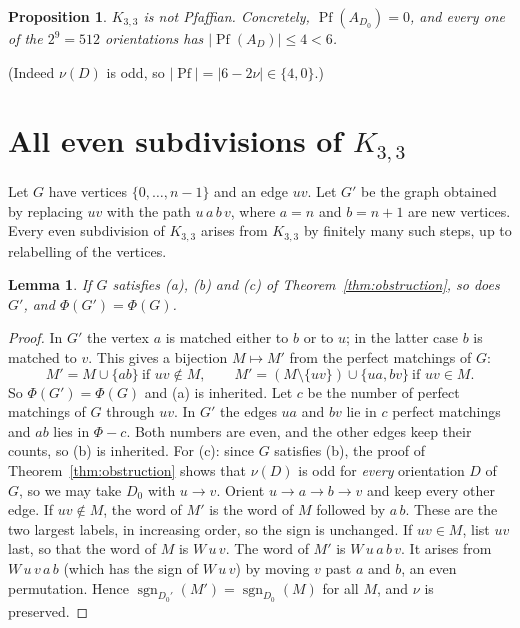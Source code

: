\documentclass[11pt]{article}
\newtheorem{lemma}[theorem]{Lemma}
\newtheorem{proposition}[theorem]{Proposition}
\theoremstyle{definition}
\theoremstyle{remark}
\begin{document}
\begin{proposition}\label{prop:k33}
$K_{3,3}$ is not Pfaffian. Concretely, $\operatorname{Pf}(A_{D_0})=0$, and every one of
the $2^9=512$ orientations has $|\operatorname{Pf}(A_D)|\le 4<6$.
\end{proposition}
(Indeed $\nu(D)$ is odd, so $|\operatorname{Pf}|=|6-2\nu|\in\{4,0\}$.)

\section[All even subdivisions of K\_\{3,3\}]{All even subdivisions of \texorpdfstring{$K_{3,3}$}{K33}}
Let $G$ have vertices $\{0,\dots,n-1\}$ and an edge $uv$. Let $G'$ be the graph
obtained by replacing $uv$ with the path $u\,a\,b\,v$, where $a=n$ and $b=n+1$ are
new vertices. Every even subdivision of $K_{3,3}$ arises from $K_{3,3}$ by finitely
many such steps, up to relabelling of the vertices.

\begin{lemma}\label{lem:sub}
If $G$ satisfies (a), (b) and (c) of Theorem~\ref{thm:obstruction}, so does $G'$, and
$\Phi(G')=\Phi(G)$.
\end{lemma}
\begin{proof}
In $G'$ the vertex $a$ is matched either to $b$ or to $u$; in the latter case $b$ is
matched to $v$. This gives a bijection $M\mapsto M'$ from the perfect matchings of $G$:
\[
M'=M\cup\{ab\}\ \text{if } uv\notin M,\qquad M'=(M\setminus\{uv\})\cup\{ua,bv\}\ \text{if } uv\in M.
\]
So $\Phi(G')=\Phi(G)$ and (a) is inherited. Let $c$ be the number of perfect
matchings of $G$ through $uv$. In $G'$ the edges $ua$ and $bv$ lie in $c$ perfect
matchings and $ab$ lies in $\Phi-c$. Both numbers are even, and the other edges keep
their counts, so (b) is inherited. For (c): since $G$ satisfies (b), the proof of
Theorem~\ref{thm:obstruction} shows that $\nu(D)$ is odd for \emph{every} orientation
$D$ of $G$, so we may take $D_0$ with $u\to v$. Orient
$u\to a\to b\to v$ and keep every other edge. If $uv\notin M$, the word of $M'$ is the word of
$M$ followed by $a\,b$. These are the two largest labels, in increasing order, so the
sign is unchanged. If $uv\in M$, list $uv$ last, so that the word of $M$ is $W\,u\,v$.
The word of $M'$ is $W\,u\,a\,b\,v$. It arises from $W\,u\,v\,a\,b$ (which has the sign of
$W\,u\,v$) by moving $v$ past $a$ and $b$, an even permutation. Hence
$\operatorname{sgn}_{D_0'}(M')=\operatorname{sgn}_{D_0}(M)$ for all $M$, and $\nu$ is
preserved.
\end{proof}
\end{document}
